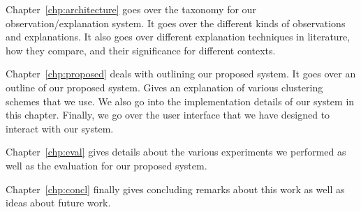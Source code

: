 Chapter~\ref{chp:architecture} goes over the taxonomy for our observation/explanation system. It goes over the different kinds of observations and explanations. It also goes over different explanation techniques in literature, how they compare, and their significance for different contexts.

Chapter~\ref{chp:proposed} deals with outlining our proposed system. It goes over an outline of our proposed system. Gives an explanation of various clustering schemes that we use. We also go into the implementation details of our system in this chapter. Finally, we go over the user interface that we have designed to interact with our system.

Chapter~\ref{chp:eval} gives details about the various experiments we performed as well as the evaluation for our proposed system.

Chapter~\ref{chp:concl} finally gives concluding remarks about this work as well as ideas about future work.
